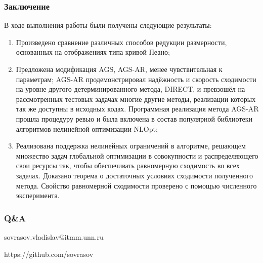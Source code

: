\documentclass[aspectratio=1610]{beamer}
\newcommand\unnumbered{\setbeamertemplate{footline}{}}
\begin{document}
\begin{frame}
  \frametitle{Заключение}
  В ходе выполнения работы были получены следующие результаты:
  \begin{enumerate}
      \item Произведено сравнение различных способов редукции размерности, основанных на отображениях типа кривой Пеано;
      \item Предложена модификация AGS, AGS-AR, менее чувствительная к параметрам; AGS-AR продемонстрировал надёжность и скорость
      сходимости на уровне другого детерминированного метода, DIRECT,
      и превзошёл на рассмотренных тестовых задачах многие другие методы, реализации которых так же доступны в исходных кодах.
      Программная реализация метода AGS-AR прошла процедуру ревью и была включена в состав популярной библиотеки
      алгоритмов нелинейной оптимизации NLOpt;
      \item Реализована поддержка нелинейных ограничений в алгоритме, решающeм
      множество задач глобальной оптимизации в совокупности и распределяющего свои ресурсы так, чтобы
      обеспечивать равномерную сходимость во всех задачах. Доказано теорема о достаточных условиях сходимости
      полученного метода. Свойство равномерной сходимости проверено с помощью численного эксперимента.
  \end{enumerate}
\end{frame}

{
\unnumbered
\begin{frame}{{}}
  \frametitle{Q\&A}
  \begin{center}
\vspace{0.5cm}

    sovrasov.vladislav@itmm.unn.ru

    https://github.com/sovrasov
  \end{center}
\end{frame}
}
\end{document}
